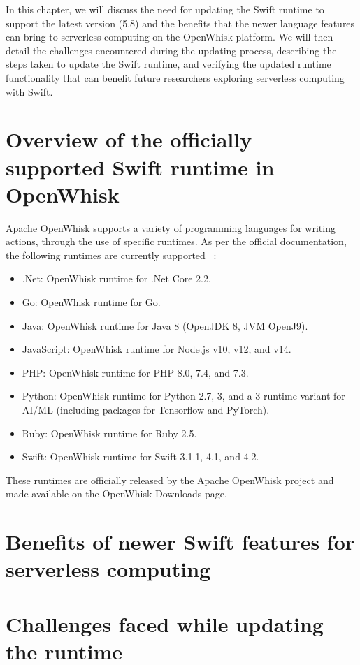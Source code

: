 In this chapter, we will discuss the need for updating the Swift runtime to support the latest version (5.8) and the benefits that the newer language features can bring to serverless computing on the OpenWhisk platform. We will then detail the challenges encountered during the updating process, describing the steps taken to update the Swift runtime, and verifying the updated runtime functionality that can benefit future researchers exploring serverless computing with Swift.

\section{Overview of the officially supported Swift runtime in OpenWhisk}
Apache OpenWhisk supports a variety of programming languages for writing actions, through the use of specific runtimes. As per the official documentation, the following runtimes are currently supported 
~\cite{openwhisk2023}:

\begin{itemize}
\item .Net: OpenWhisk runtime for .Net Core 2.2.
\item Go: OpenWhisk runtime for Go.
\item Java: OpenWhisk runtime for Java 8 (OpenJDK 8, JVM OpenJ9).
\item JavaScript: OpenWhisk runtime for Node.js v10, v12, and v14.
\item PHP: OpenWhisk runtime for PHP 8.0, 7.4, and 7.3.
\item Python: OpenWhisk runtime for Python 2.7, 3, and a 3 runtime variant for AI/ML (including packages for Tensorflow and PyTorch).
\item Ruby: OpenWhisk runtime for Ruby 2.5.
\item Swift: OpenWhisk runtime for Swift 3.1.1, 4.1, and 4.2.
\end{itemize}

These runtimes are officially released by the Apache OpenWhisk project and made available on the OpenWhisk Downloads page.

\section{Benefits of newer Swift features for serverless computing}

\section{Challenges faced while updating the runtime}

